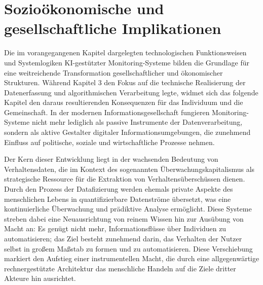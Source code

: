 \chapter{Sozioökonomische und gesellschaftliche Implikationen}

Die im vorangegangenen Kapitel dargelegten technologischen Funktionsweisen und Systemlogiken \ac{KI}-gestützter Monitoring-Systeme bilden die Grundlage für eine weitreichende Transformation gesellschaftlicher und ökonomischer Strukturen. Während Kapitel 3 den Fokus auf die technische Realisierung der Datenerfassung und algorithmischen Verarbeitung legte, widmet sich das folgende Kapitel den daraus resultierenden Konsequenzen für das Individuum und die Gemeinschaft. In der modernen Informationsgesellschaft fungieren Monitoring-Systeme nicht mehr lediglich als passive Instrumente der Datenverarbeitung, sondern als aktive Gestalter digitaler Informationsumgebungen, die zunehmend Einfluss auf politische, soziale und wirtschaftliche Prozesse nehmen.

Der Kern dieser Entwicklung liegt in der wachsenden Bedeutung von Verhaltensdaten, die im Kontext des sogenannten Überwachungskapitalismus als strategische Ressource für die Extraktion von Verhaltensüberschüssen dienen. Durch den Prozess der Datafizierung werden ehemals private Aspekte des menschlichen Lebens in quantifizierbare Datenströme übersetzt, was eine kontinuierliche Überwachung und prädiktive Analyse ermöglicht. Diese Systeme streben dabei eine Neuausrichtung von reinem Wissen hin zur Ausübung von Macht an: Es genügt nicht mehr, Informationsflüsse über Individuen zu automatisieren; das Ziel besteht zunehmend darin, das Verhalten der Nutzer selbst in großem Maßstab zu formen und zu automatisieren. Diese Verschiebung markiert den Aufstieg einer instrumentellen Macht, die durch eine allgegenwärtige rechnergestützte Architektur das menschliche Handeln auf die Ziele dritter Akteure hin ausrichtet.

